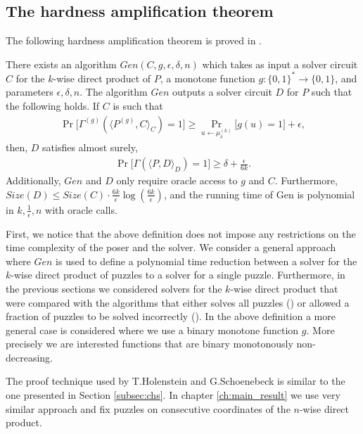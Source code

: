\subsection{The hardness amplification theorem}
The following hardness amplification theorem is proved in \cite{DBLP:journals/corr/abs-1002-3534}.
\begin{theorem}
There exists an algorithm $\mathit{Gen}(C,g,\epsilon, \delta, n)$ which takes as input a solver circuit $C$ for the $k$-wise
direct product of $P$, a monotone function $g: \{0,1\}^{*} \rightarrow \{0,1\}$, and parameters $\epsilon,\delta,n$.
The algorithm $\mathit{Gen}$ outputs a solver circuit $D$ for $P$ such that the following holds.
If $C$ is such that
\begin{align*}
\Pr\Big[\Gamma^{(g)}(\langle P^{(g)}, C \rangle_C) = 1\Big] \geq \Pr_{u \leftarrow \mu_{\delta}^{(k)}} \Big[ g(u) = 1 \Big] + \epsilon,
\end{align*}
then, $D$ satisfies almost surely,
\begin{align*}
  \Pr\Big[ \Gamma(\langle P, D\rangle_{D}) = 1\Big] \geq \delta + \frac{\epsilon}{6k}.
\end{align*}
Additionally, $\mathit{Gen}$ and $D$ only require oracle access to $g$ and $C$.
Furthermore, $\mathit{Size}(D) \leq \mathit{Size}(C) \cdot \frac{6k}{\epsilon} \log(\frac{6k}{\epsilon})$,
and the running time of Gen is polynomial in $k, \frac{1}{\epsilon}, n$ with oracle calls.
\end{theorem}

First, we notice that the above definition does not impose any restrictions on the time complexity of the poser and the solver.
We consider a general approach where $\mathit{Gen}$ is used to define a polynomial time reduction between a solver for the $k$-wise
direct product of puzzles to a solver for a single puzzle.
Furthermore, in the previous sections we considered solvers for the $k$-wise direct product that were compared with the algorithms that either
solves all puzzles (\cite{canetti2004hardness}) or allowed a fraction of puzzles to be solved incorrectly (\cite{Dodis:2009:SAI:1530441.1530450}).
In the above definition a more general case is considered where we use a binary monotone function $g$.
More precisely we are interested functions that are binary monotonously non-decreasing.

The proof technique used by T.Holenstein and G.Schoenebeck is similar to the one presented in Section \ref{subsec:chs}.
In chapter \ref{ch:main_result} we use very similar approach and fix puzzles on consecutive coordinates of the $n$-wise direct product.

